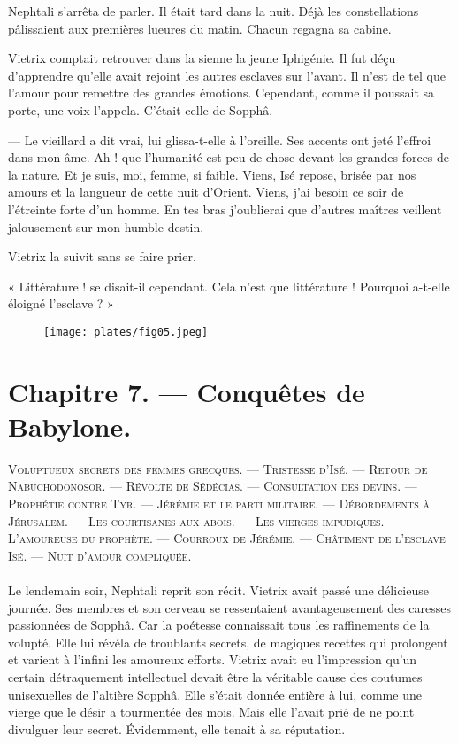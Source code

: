 \documentclass[a4paper, 11pt, oneside, polutonikogreek, french]{article}
\begin{document}
\bigskip
\centerline{\EightStarTaper}
\centerline{\EightStarTaper\EightStarTaper}
\bigskip

Nephtali s'arrêta de parler. Il était tard dans la nuit. Déjà les constellations pâlissaient aux premières lueures du matin. Chacun regagna sa cabine.

Vietrix comptait retrouver dans la sienne la jeune Iphigénie. Il fut déçu d'apprendre qu'elle avait rejoint les autres esclaves sur l'avant. Il n'est de tel que l'amour pour remettre des grandes émotions. Cependant, comme il poussait sa porte, une voix l'appela. C'était celle de Sopphâ.

--- Le vieillard a dit vrai, lui glissa-t-elle à l'oreille. Ses accents ont jeté l'effroi dans mon âme. Ah ! que l'humanité est peu de chose devant les grandes forces de la nature. Et je suis, moi, femme, si faible. Viens, Isé repose, brisée par nos amours et la langueur de cette nuit d'Orient. Viens, j'ai besoin ce soir de l'étreinte forte d'un homme. En tes bras j'oublierai que d'autres maîtres veillent jalousement sur mon humble destin.

Vietrix la suivit sans se faire prier.

« Littérature ! se disait-il cependant. Cela n'est que littérature ! Pourquoi a-t-elle éloigné l'esclave ? »
\clearpage
\begin{figure}[H]
\centering
\texttt{[image: plates/fig05.jpeg]}
\end{figure}
\section{Chapitre 7. --- Conquêtes de Babylone.}
\begin{center}
\scshape
\small
Voluptueux secrets des femmes grecques. --- Tristesse d'Isé. --- Retour de Nabuchodonosor. --- Révolte de Sédécias. --- Consultation des devins. --- Prophétie contre Tyr. --- Jérémie et le parti militaire. --- Débordements à Jérusalem. --- Les courtisanes aux abois. --- Les vierges impudiques. --- L'amoureuse du prophète. --- Courroux de Jérémie. --- Châtiment de l'esclave Isé. --- Nuit d'amour compliquée.
\end{center}
\paragraph{}
Le lendemain soir, Nephtali reprit son récit. Vietrix avait passé une délicieuse journée. Ses membres et son cerveau se ressentaient avantageusement des caresses passionnées de Sopphâ. Car la poétesse connaissait tous les raffinements de la volupté. Elle lui révéla de troublants secrets, de magiques recettes qui prolongent et varient à l'infini les amoureux efforts. Vietrix avait eu l'impression qu'un certain détraquement intellectuel devait être la véritable cause des coutumes unisexuelles de l'altière Sopphâ. Elle s'était donnée entière à lui, comme une vierge que le désir a tourmentée des mois. Mais elle l'avait prié de ne point divulguer leur secret. Évidemment, elle tenait à sa réputation.
\end{document}
